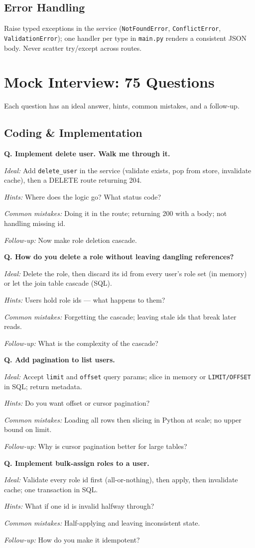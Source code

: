 \documentclass[11pt,a4paper]{report}
\newcommand{\mq}[5]{%
  \par\smallskip\noindent\textbf{Q. #1}\par
  \textit{Ideal:} #2\par
  \textit{Hints:} #3\par
  \textit{Common mistakes:} #4\par
  \textit{Follow-up:} #5\par\smallskip
}
\begin{document}
\section{Error Handling}
Raise typed exceptions in the service (\texttt{NotFoundError},
\texttt{ConflictError}, \texttt{ValidationError}); one handler per type in
\texttt{main.py} renders a consistent JSON body. Never scatter try/except across
routes.

\chapter{Mock Interview: 75 Questions}

Each question has an ideal answer, hints, common mistakes, and a follow-up.

\section{Coding \& Implementation}
\mq{Implement delete user. Walk me through it.}
{Add \texttt{delete\_user} in the service (validate exists, pop from store,
invalidate cache), then a DELETE route returning 204.}
{Where does the logic go? What status code?}
{Doing it in the route; returning 200 with a body; not handling missing id.}
{Now make role deletion cascade.}

\mq{How do you delete a role without leaving dangling references?}
{Delete the role, then discard its id from every user's role set (in memory) or
let the join table cascade (SQL).}
{Users hold role ids --- what happens to them?}
{Forgetting the cascade; leaving stale ids that break later reads.}
{What is the complexity of the cascade?}

\mq{Add pagination to list users.}
{Accept \texttt{limit} and \texttt{offset} query params; slice in memory or
\texttt{LIMIT/OFFSET} in SQL; return metadata.}
{Do you want offset or cursor pagination?}
{Loading all rows then slicing in Python at scale; no upper bound on limit.}
{Why is cursor pagination better for large tables?}

\mq{Implement bulk-assign roles to a user.}
{Validate every role id first (all-or-nothing), then apply, then invalidate
cache; one transaction in SQL.}
{What if one id is invalid halfway through?}
{Half-applying and leaving inconsistent state.}
{How do you make it idempotent?}
\end{document}
